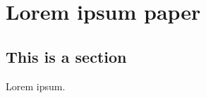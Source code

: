 \acresetall %
\chapter*{Lorem ipsum paper}


\begin{abstract}
	Abstract.
\end{abstract}


\section{This is a section}
\label{Paper2017Lorem:sec:introduction}

Lorem ipsum.